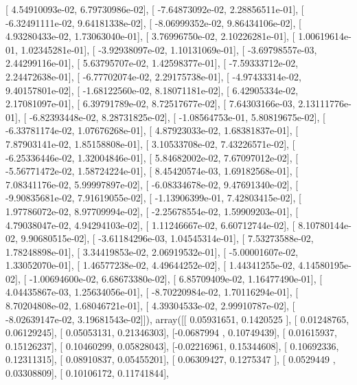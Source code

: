 \documentclass{article}
\begin{document}
       [  4.54910093e-02,   6.79730986e-02],
       [ -7.64873092e-02,   2.28856511e-01],
       [ -6.32491111e-02,   9.64181338e-02],
       [ -8.06999352e-02,   9.86434106e-02],
       [  4.93280433e-02,   1.73063040e-01],
       [  3.76996750e-02,   2.10226281e-01],
       [  1.00619614e-01,   1.02345281e-01],
       [ -3.92938097e-02,   1.10131069e-01],
       [ -3.69798557e-03,   2.44299116e-01],
       [  5.63795707e-02,   1.42598377e-01],
       [ -7.59333712e-02,   2.24472638e-01],
       [ -6.77702074e-02,   2.29175738e-01],
       [ -4.97433314e-02,   9.40157801e-02],
       [ -1.68122560e-02,   8.18071181e-02],
       [  6.42905334e-02,   2.17081097e-01],
       [  6.39791789e-02,   8.72517677e-02],
       [  7.64303166e-03,   2.13111776e-01],
       [ -6.82393448e-02,   8.28731825e-02],
       [ -1.08564753e-01,   5.80819675e-02],
       [ -6.33781174e-02,   1.07676268e-01],
       [  4.87923033e-02,   1.68381837e-01],
       [  7.87903141e-02,   1.85158808e-01],
       [  3.10533708e-02,   7.43226571e-02],
       [ -6.25336446e-02,   1.32004846e-01],
       [  5.84682002e-02,   7.67097012e-02],
       [ -5.56771472e-02,   1.58724224e-01],
       [  8.45420574e-03,   1.69182568e-01],
       [  7.08341176e-02,   5.99997897e-02],
       [ -6.08334678e-02,   9.47691340e-02],
       [ -9.90835681e-02,   7.91619055e-02],
       [ -1.13906399e-01,   7.42803415e-02],
       [  1.97786072e-02,   8.97709994e-02],
       [ -2.25678554e-02,   1.59909203e-01],
       [  4.79038047e-02,   4.94294103e-02],
       [  1.11246667e-02,   6.60712744e-02],
       [  8.10780144e-02,   9.90680515e-02],
       [ -3.61184296e-03,   1.04545314e-01],
       [  7.53273588e-02,   1.78248898e-01],
       [  3.34419853e-02,   2.06919532e-01],
       [ -5.00001607e-02,   1.33052070e-01],
       [  1.46577238e-02,   4.49644252e-02],
       [  1.44341255e-02,   4.14580195e-02],
       [ -1.00694600e-02,   6.68673380e-02],
       [  6.85709409e-02,   1.16477490e-01],
       [  4.04435867e-03,   1.25634056e-01],
       [ -8.70220984e-02,   1.70116294e-01],
       [  8.70204808e-02,   1.68046721e-01],
       [  4.39304533e-02,   2.99910787e-02],
       [ -8.02639147e-02,   3.19681543e-02]]), array([[ 0.05931651,  0.1420525 ],
       [ 0.01248765,  0.06129245],
       [ 0.05053131,  0.21346303],
       [-0.0687994 ,  0.10749439],
       [ 0.01615937,  0.15126237],
       [ 0.10460299,  0.05828043],
       [-0.02216961,  0.15344608],
       [ 0.10692336,  0.12311315],
       [ 0.08910837,  0.05455201],
       [ 0.06309427,  0.1275347 ],
       [ 0.0529449 ,  0.03308809],
       [ 0.10106172,  0.11741844],
\end{document}
